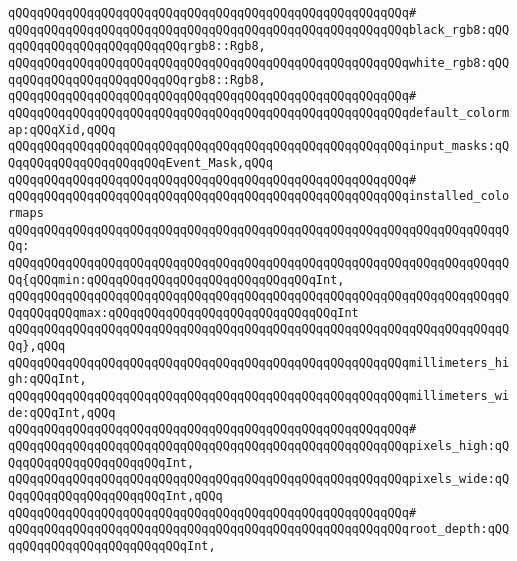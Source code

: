 \verb|qQQqqQQqqQQqqQQqqQQqqQQqqQQqqQQqqQQqqQQqqQQqqQQqqQQqqQQq#|\newline
\verb|qQQqqQQqqQQqqQQqqQQqqQQqqQQqqQQqqQQqqQQqqQQqqQQqqQQqqQQqblack_rgb8:qQQqqQQqqQQqqQQqqQQqqQQqqQQqrgb8::Rgb8,|\newline
\verb|qQQqqQQqqQQqqQQqqQQqqQQqqQQqqQQqqQQqqQQqqQQqqQQqqQQqqQQqwhite_rgb8:qQQqqQQqqQQqqQQqqQQqqQQqqQQqrgb8::Rgb8,|\newline
\verb|qQQqqQQqqQQqqQQqqQQqqQQqqQQqqQQqqQQqqQQqqQQqqQQqqQQqqQQq#|\newline
\verb|qQQqqQQqqQQqqQQqqQQqqQQqqQQqqQQqqQQqqQQqqQQqqQQqqQQqqQQqdefault_colormap:qQQqXid,qQQq|\newline
\verb|qQQqqQQqqQQqqQQqqQQqqQQqqQQqqQQqqQQqqQQqqQQqqQQqqQQqqQQqinput_masks:qQQqqQQqqQQqqQQqqQQqqQQqEvent_Mask,qQQq|\newline
\verb|qQQqqQQqqQQqqQQqqQQqqQQqqQQqqQQqqQQqqQQqqQQqqQQqqQQqqQQq#|\newline
\verb|qQQqqQQqqQQqqQQqqQQqqQQqqQQqqQQqqQQqqQQqqQQqqQQqqQQqqQQqinstalled_colormaps|\newline
\verb|qQQqqQQqqQQqqQQqqQQqqQQqqQQqqQQqqQQqqQQqqQQqqQQqqQQqqQQqqQQqqQQqqQQqqQQq:|\newline
\verb|qQQqqQQqqQQqqQQqqQQqqQQqqQQqqQQqqQQqqQQqqQQqqQQqqQQqqQQqqQQqqQQqqQQqqQQq{qQQqmin:qQQqqQQqqQQqqQQqqQQqqQQqqQQqqQQqInt,|\newline
\verb|qQQqqQQqqQQqqQQqqQQqqQQqqQQqqQQqqQQqqQQqqQQqqQQqqQQqqQQqqQQqqQQqqQQqqQQqqQQqqQQqmax:qQQqqQQqqQQqqQQqqQQqqQQqqQQqqQQqInt|\newline
\verb|qQQqqQQqqQQqqQQqqQQqqQQqqQQqqQQqqQQqqQQqqQQqqQQqqQQqqQQqqQQqqQQqqQQqqQQq},qQQq|\newline
\newline
\verb|qQQqqQQqqQQqqQQqqQQqqQQqqQQqqQQqqQQqqQQqqQQqqQQqqQQqqQQqmillimeters_high:qQQqInt,|\newline
\verb|qQQqqQQqqQQqqQQqqQQqqQQqqQQqqQQqqQQqqQQqqQQqqQQqqQQqqQQqmillimeters_wide:qQQqInt,qQQq|\newline
\verb|qQQqqQQqqQQqqQQqqQQqqQQqqQQqqQQqqQQqqQQqqQQqqQQqqQQqqQQq#|\newline
\verb|qQQqqQQqqQQqqQQqqQQqqQQqqQQqqQQqqQQqqQQqqQQqqQQqqQQqqQQqpixels_high:qQQqqQQqqQQqqQQqqQQqqQQqInt,|\newline
\verb|qQQqqQQqqQQqqQQqqQQqqQQqqQQqqQQqqQQqqQQqqQQqqQQqqQQqqQQqpixels_wide:qQQqqQQqqQQqqQQqqQQqqQQqInt,qQQq|\newline
\verb|qQQqqQQqqQQqqQQqqQQqqQQqqQQqqQQqqQQqqQQqqQQqqQQqqQQqqQQq#|\newline
\verb|qQQqqQQqqQQqqQQqqQQqqQQqqQQqqQQqqQQqqQQqqQQqqQQqqQQqqQQqroot_depth:qQQqqQQqqQQqqQQqqQQqqQQqqQQqInt,|\newline
